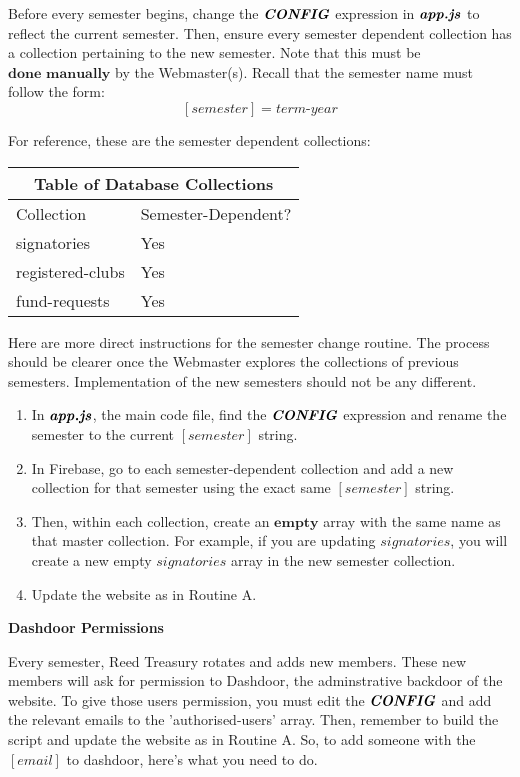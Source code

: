 \documentclass[a4paper]{article}
\begin{document}
Before every semester begins, change the $\textbf{\textit{CONFIG}}$ expression in $\textbf{\textit{app.js}}$ to reflect the current semester. Then, ensure every semester dependent collection has a collection pertaining to the new semester. Note that this must be $\textbf{done manually}$ by the Webmaster(s). Recall that the semester name must follow the form:
$$[semester] = \textit{term-year}$$

For reference, these are the semester dependent collections:

\begin{center}
\begin{tabular}{ |p{4cm}||p{4cm}|  }
 \hline
 \multicolumn{2}{|c|}{Table of Database Collections} \\
 \hline
 Collection & Semester-Dependent? \\
 \hline
 signatories & Yes \\
 registered-clubs & Yes \\
 fund-requests & Yes \\
 \hline
\end{tabular}
\end{center}

Here are more direct instructions for the semester change routine. The process should be clearer once the Webmaster explores the collections of previous semesters. Implementation of the new semesters should not be any different.

\begin{enumerate}
  \item In $\textbf{\textit{app.js}}$, the main code file, find the $\textbf{\textit{CONFIG}}$ expression and rename the semester to the current $[semester]$ string.
  \item In Firebase, go to each semester-dependent collection and add a new collection for that semester using the exact same $[semester]$ string.
  \item Then, within each collection, create an $\textbf{empty}$ array with the same name as that master collection. For example, if you are updating $signatories$, you will create a new empty $signatories$ array in the new semester collection.
  \item Update the website as in Routine A.
\end{enumerate}

\begin{center}
\textbf{Dashdoor Permissions}
\end{center}

Every semester, Reed Treasury rotates and adds new members. These new members will ask for permission to Dashdoor, the adminstrative backdoor of the website. To give those users permission, you must edit the $\textbf{\textit{CONFIG}}$ and add the relevant emails to the 'authorised-users' array. Then, remember to build the script and update the website as in Routine A. So, to add someone with the $[email]$ to dashdoor, here's what you need to do.
\end{document}
